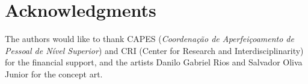 \documentclass{sigchi}
\begin{document}
\section{Acknowledgments}

	The authors would like to thank CAPES (\textit{Coordena\c{c}\~ao de Aperfei\c{c}oamento de Pessoal de N\'ivel Superior}) and CRI (Center for Research and Interdisciplinarity) for the financial support, and the artists Danilo Gabriel Rios and Salvador Oliva Junior for the concept art.

%
%
%
%
%
\balance



\end{document}
